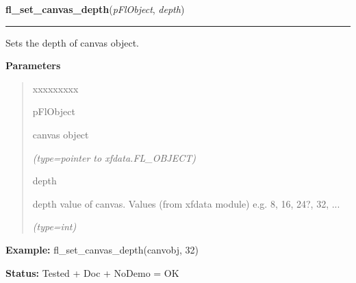 \hspace{.8\funcindent}\begin{boxedminipage}{\funcwidth}

    \raggedright \textbf{fl\_set\_canvas\_depth}(\textit{pFlObject}, \textit{depth})

    \vspace{-1.5ex}

    \rule{\textwidth}{0.5\fboxrule}
\setlength{\parskip}{2ex}
    Sets the depth of canvas object.

\setlength{\parskip}{1ex}
      \textbf{Parameters}
      \vspace{-1ex}

      \begin{quote}
        \begin{Ventry}{xxxxxxxxx}

          \item[pFlObject]

          canvas object

            {\it (type=pointer to xfdata.FL\_OBJECT)}

          \item[depth]

          depth value of canvas. Values (from xfdata module) e.g. 8, 16, 
          24?, 32, ...

            {\it (type=int)}

        \end{Ventry}

      \end{quote}

\textbf{Example:} fl\_set\_canvas\_depth(canvobj, 32)



\textbf{Status:} Tested + Doc + NoDemo = OK



    \end{boxedminipage}

    \label{xformslib:flcanvas:fl_set_canvas_attributes}

    \vspace{0.5ex}

